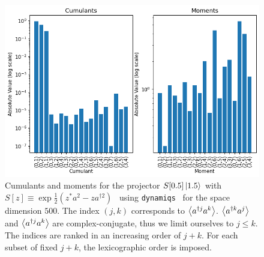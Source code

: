 \begin{center}
    \begin{figure}[h!]
      \centering
      \includegraphics[width=0.9\linewidth]{Pics/PictureSqueeze.pdf}
      \caption{Cumulants and moments for the projector $S[0.5] \ket{1.5}$ with $S[z] \equiv \exp{\frac{1}{2}\left(z^* a^2 - z a^{\dagger 2}\right)}$~\cite{dynamiqs-squeeze} using \texttt{dynamiqs}~\cite{dynamiqs} for the space dimension $500$. The index $(j, k)$ corresponds to $\left\langle a^{\dagger j} a^k \right\rangle$. $\left\langle a^{\dagger k} a^j \right\rangle$ and $\left\langle a^{\dagger j} a^k \right\rangle$ are complex-conjugate, thus we limit ourselves to $j \le k$. The indices are ranked in an increasing order of $j+k$. For each subset of fixed $j+k$, the lexicographic order is imposed.}
      \label{fig:PictureSqueeze}
    \end{figure}
\end{center}


